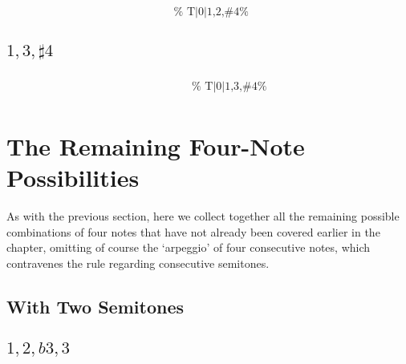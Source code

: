 \documentclass[english]{./gbook}
\begin{document}
\begin{large}
\[\begin{array}{ll}
&
	\text{
	}
\end{array}
\]

\subsection*{$1,3,\sharp4$}
\[
\begin{array}{ll}
	\begin{array}{c}
		\begin{array}{ccc}
			&%
			&%
		\end{array}
		\\
		\begin{array}{cc}
			&%
		\end{array}
	\end{array}

&
	\text{
	}
\end{array}
\]


\section{The Remaining Four-Note Possibilities}

As with the previous section, here we collect together all the remaining possible combinations of four notes that have not already been covered earlier in the chapter, omitting of course the `arpeggio' of four consecutive notes, which contravenes the rule regarding consecutive semitones.

\subsection*{With Two Semitones}

\subsection*{$1,2,b3,3$}
\[
\begin{array}{ll}
	\begin{array}{c}
		\begin{array}{ccc}
			&%
			&%
		\end{array}
		\\
		\begin{array}{cc}
			&%
		\end{array}
	\end{array}


\end{array}\]
\end{large}
\end{document}
